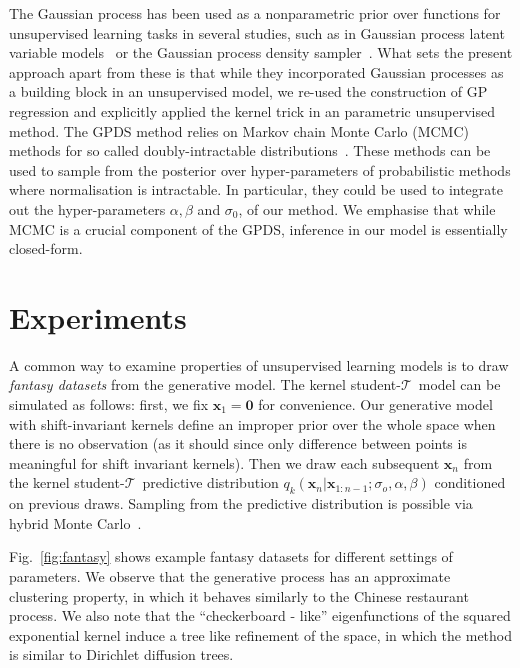 \documentclass[twoside]{article}
\newcommand{\studentt}{student-$\mathcal{T}$\ }
\newcommand{\varconc}{\alpha}
\newcommand{\meanconc}{\beta}
\begin{document}
The Gaussian process has been used as a nonparametric prior over functions for unsupervised learning tasks in several studies, such as in Gaussian process latent variable models~\cite[GPLVMs]{Lawrence2004} or the Gaussian process density sampler~\cite[GPDS]{Adams2009}. What sets the present approach apart from these is that while they incorporated Gaussian processes as a building block in an unsupervised model, we re-used the construction of GP regression and explicitly applied the kernel trick in an parametric unsupervised method. The GPDS method relies on Markov chain Monte Carlo (MCMC) methods for so called doubly-intractable distributions~\cite{Murray2006}. These methods can be used to sample from the posterior over hyper-parameters of probabilistic methods where normalisation is intractable. In particular, they could be used to integrate out the hyper-parameters $\varconc,\meanconc$ and $\sigma_0$, of our method. We emphasise that while MCMC is a crucial component of the GPDS, inference in our model is essentially closed-form.

\section{Experiments\label{sec:experiments}}

A common way to examine properties of unsupervised learning models is to draw \emph{fantasy datasets} from the generative model. The kernel \studentt model can be simulated as follows: first, we fix $\bm{x}_1=\bm{0}$ for convenience. Our generative model with shift-invariant kernels define an improper prior over the whole space when there is no observation (as it should since only difference between points is meaningful for shift invariant kernels). Then we draw each subsequent $\bm{x}_n$ from the kernel \studentt predictive distribution $q_{k}(\bm{x}_n\vert\bm{x}_{1:n-1};\sigma_o,\varconc,\meanconc)$ conditioned on previous draws. Sampling from the predictive distribution is possible via hybrid Monte Carlo~\cite{Neal2010}.

Fig.~\ref{fig:fantasy} shows example fantasy datasets for different settings of parameters. We observe that the generative process has an approximate clustering property, in which it behaves similarly to the Chinese restaurant process. We also note that the ``checkerboard - like'' eigenfunctions of the squared exponential kernel induce a tree like refinement of the space, in which the method is similar to Dirichlet diffusion trees.
\end{document}
